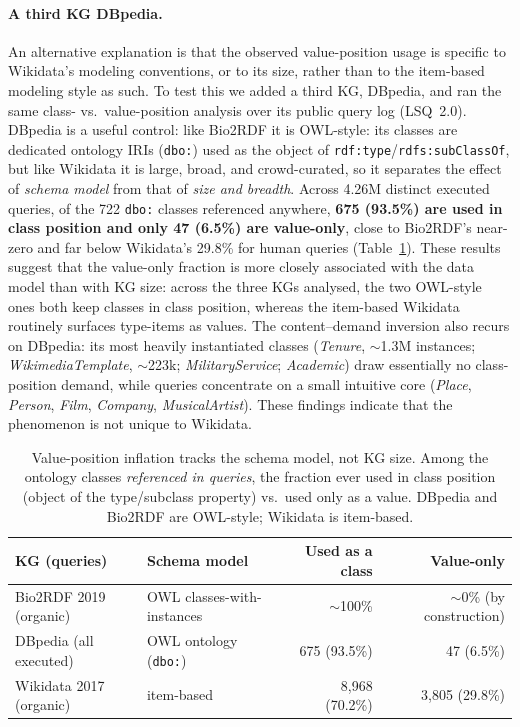 \documentclass[sw]{iosart2x}
\begin{document}
\paragraph{\textbf{A third KG DBpedia.}} An alternative explanation is that the observed value-position usage is specific to Wikidata's modeling conventions, or to its size, rather than to the item-based modeling style as such. To test this we added a third KG, DBpedia, and ran the same class- vs.\ value-position analysis over its public query log (LSQ~2.0). DBpedia is a useful control: like Bio2RDF it is OWL-style: its classes are dedicated ontology IRIs (\texttt{dbo:}) used as the object of \texttt{rdf:type}/\texttt{rdfs:subClassOf}, but like Wikidata it is large, broad, and crowd-curated, so it separates the effect of \emph{schema model} from that of \emph{size and breadth}. Across 4.26M distinct executed queries, of the 722 \texttt{dbo:} classes referenced anywhere, \textbf{675 (93.5\%) are used in class position and only 47 (6.5\%) are value-only}, close to Bio2RDF's near-zero and far below Wikidata's 29.8\% for human queries (Table~\ref{tab:generality}). These results suggest that the value-only fraction is more closely associated with the data model than with KG size: across the three KGs analysed, the two OWL-style ones both keep classes in class position, whereas the item-based Wikidata routinely surfaces type-items as values. The content--demand inversion also recurs on DBpedia: its most heavily instantiated classes (\emph{Tenure}, $\sim$1.3M instances; \emph{WikimediaTemplate}, $\sim$223k; \emph{MilitaryService}; \emph{Academic}) draw essentially no class-position demand, while queries concentrate on a small intuitive core (\emph{Place}, \emph{Person}, \emph{Film}, \emph{Company}, \emph{MusicalArtist}). These findings indicate that the phenomenon is not unique to Wikidata.

\begin{table}[ht]
\centering
\caption{Value-position inflation tracks the schema model, not KG size. Among the ontology classes \emph{referenced in queries}, the fraction ever used in class position (object of the type/subclass property) vs.\ used only as a value. DBpedia and Bio2RDF are OWL-style; Wikidata is item-based.}
\label{tab:generality}
\begin{tabular}{l|l|r|r}
\hline
KG (queries) & Schema model & Used as a class & Value-only \\
\hline
Bio2RDF 2019 (organic) & OWL classes-with-instances & $\sim$100\% & $\sim$0\% (by construction) \\
DBpedia (all executed) & OWL ontology (\texttt{dbo:}) & 675 (93.5\%) & 47 (6.5\%) \\
Wikidata 2017 (organic) & item-based & 8,968 (70.2\%) & 3,805 (29.8\%) \\
\hline
\end{tabular}
\end{table}
\end{document}
